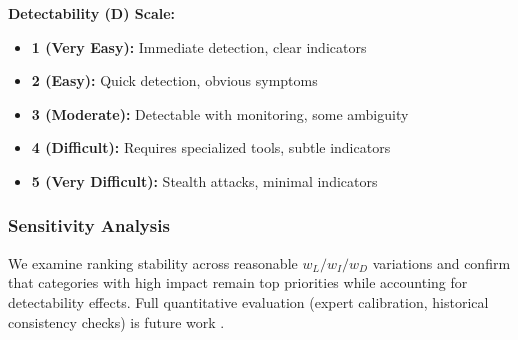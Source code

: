 \textbf{Detectability (D) Scale:}
\begin{itemize}
    \item \textbf{1 (Very Easy):} Immediate detection, clear indicators
    \item \textbf{2 (Easy):} Quick detection, obvious symptoms
    \item \textbf{3 (Moderate):} Detectable with monitoring, some ambiguity
    \item \textbf{4 (Difficult):} Requires specialized tools, subtle indicators
    \item \textbf{5 (Very Difficult):} Stealth attacks, minimal indicators
\end{itemize}

\subsubsection{Sensitivity Analysis}
We examine ranking stability across reasonable $w_L/w_I/w_D$ variations and confirm that categories with high impact remain top priorities while accounting for detectability effects. Full quantitative evaluation (expert calibration, historical consistency checks) is future work \cite{FAIRCalibratedEstimation,ADICorrelation}.
